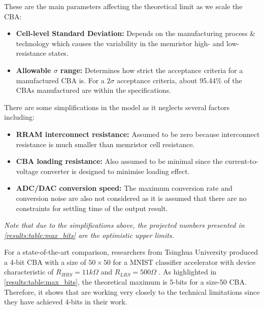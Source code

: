 \vspace{-0.5em}

\noindent
These are the main parameters affecting the theoretical limit as we scale the CBA:

\begin{itemize}
    \item \textbf{Cell-level Standard Deviation:} Depends on the manufacturing process \& technology which causes the variability in the memristor high- and low-resistance states.
    \item \textbf{Allowable $\sigma$ range:} Determines how strict the acceptance criteria for a manufactured {CBA} is. For a $2\sigma$ acceptance criteria, about 95.44\% of the CBAs manufactured are within the specifications.
\end{itemize}

\vspace{0.5em}
\noindent
There are some simplifications in the model as it neglects several factors including:

\begin{itemize}
    \item \textbf{RRAM interconnect resistance:} Assumed to be zero because interconnect resistance is much smaller than memristor cell resistance.
    
    \item \textbf{{CBA} loading resistance:} Also assumed to be minimal since the current-to-voltage converter is designed to minimise loading effect.

    \item \textbf{ADC/DAC conversion speed:} The maximum conversion rate and conversion noise are also not considered as it is assumed that there are no constraints for settling time of the output result.
\end{itemize}

\vspace{0.5em}

\noindent
\emph{Note that due to the simplifications above, the projected numbers presented in \autoref{results:table:max_bits} are the optimistic upper limits.}

\vspace{0.5em}
For a state-of-the-art comparison, researchers from Tsinghua University produced a 4-bit {CBA} with a size of $50\times 50$ for a MNIST classifier accelerator with device characteristic of $R_{HRS} = 11 k\Omega$ and $R_{LRS} = 500 \Omega$ \cite{PengGu2015}. As highlighted in \autoref{results:table:max_bits}, the theoretical maximum is 5-bits for a size-50 {CBA}. Therefore, it shows that \citet{PengGu2015} \cite{PengGu2015} are working very closely to the technical limitations since they have achieved 4-bits in their work.

